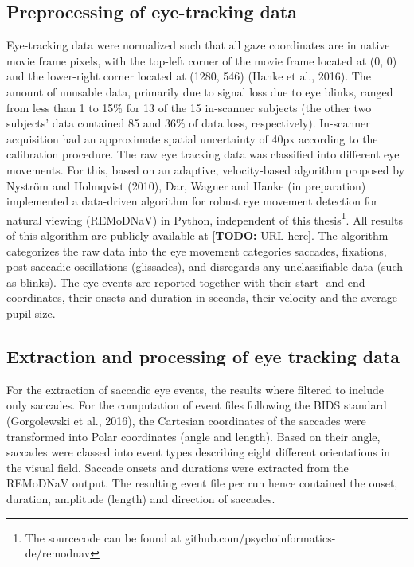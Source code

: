 \documentclass[a4paper, 12pt]{scrreprt}
\begin{document}
\subsection{Preprocessing of eye-tracking data}
Eye-tracking data were normalized such that all gaze coordinates are in native movie frame pixels, with the top-left corner of the movie frame located at (0, 0) and the lower-right corner located at (1280, 546) (Hanke et al., 2016). The amount of unusable data, primarily due to signal loss due to eye blinks, ranged from less than 1 to 15\% for 13 of the 15 in-scanner subjects (the other two subjects’ data contained 85 and 36\% of data loss, respectively). In-scanner acquisition had an approximate spatial uncertainty of 40px according to the calibration procedure. \newline
The raw eye tracking data was classified into different eye movements. For this, based on an adaptive, velocity-based algorithm proposed by Nyström and Holmqvist (2010), Dar, Wagner and  Hanke (in preparation) implemented a data-driven algorithm for robust eye movement detection for natural viewing (REMoDNaV) in Python, independent of this thesis\footnote{The sourcecode can be found at github.com/psychoinformatics-de/remodnav}. All results of this algorithm are publicly available at [\textbf{TODO: }URL here]. The algorithm categorizes the raw data into the eye movement categories saccades, fixations, post-saccadic oscillations (glissades), and disregards any unclassifiable data (such as blinks). The eye events are reported together with their start- and end coordinates, their onsets and duration in seconds, their velocity and the average pupil size.

\subsection{Extraction and processing of eye tracking data}

For the extraction of saccadic eye events, the results where filtered to include only saccades. For the computation of event files following the BIDS standard (Gorgolewski et al., 2016), the Cartesian coordinates of the saccades were transformed into Polar coordinates (angle and length). Based on their angle, saccades were classed into event types describing eight different orientations in the visual field. Saccade onsets and durations were extracted from the REMoDNaV output. The resulting event file per run hence contained the onset, duration, amplitude (length) and direction of saccades. \newline
\end{document}
